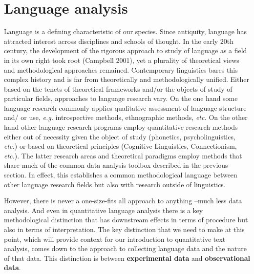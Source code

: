 \documentclass[
  letterpaper,
]{latex/krantz}
\begin{document}
\hypertarget{language-analysis}{%
\section{Language analysis}\label{language-analysis}}

Language is a defining characteristic of our species. Since antiquity,
language has attracted interest across disciplines and schools of
thought. In the early 20th century, the development of the rigorous
approach to study of language as a field in its own right took root
(Campbell 2001), yet a plurality of theoretical views and methodological
approaches remained. Contemporary linguistics bares this complex history
and is far from theoretically and methodologically unified. Either based
on the tenets of theoretical frameworks and/or the objects of study of
particular fields, approaches to language research vary. On the one hand
some language research commonly applies qualitative assessment of
language structure and/ or use, \emph{e.g.} introspective methods,
ethnographic methods, \emph{etc.} On the other hand other language
research programs employ quantitative research methods either out of
necessity given the object of study (phonetics, psycholinguistics,
\emph{etc.}) or based on theoretical principles (Cognitive Linguistics,
Connectionism, \emph{etc.}). The latter research areas and theoretical
paradigms employ methods that share much of the common data analysis
toolbox described in the previous section. In effect, this establishes a
common methodological language between other language research fields
but also with research outside of linguistics.

However, there is never a one-size-fits all approach to anything --much
less data analysis. And even in quantitative language analysis there is
a key methodological distinction that has downstream effects in terms of
procedure but also in terms of interpretation. The key distinction that
we need to make at this point, which will provide context for our
introduction to quantitative text analysis, comes down to the approach
to collecting language data and the nature of that data. This
distinction is between \textbf{experimental
data} and \textbf{observational
data}.
\end{document}
